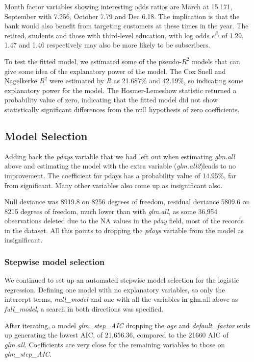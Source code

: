 \documentclass[9pt,technote]{IEEEtran}
\begin{document}
Month factor variables showing interesting odds ratios are March at 15.171, September with 7.256, October 7.79 and Dec 6.18.  The implication is that the bank would also benefit from targeting customers at these times in the year.  The retired, students and those with third-level education, with log odds $e^{\beta_i}$ of 1.29, 1.47 and 1.46 respectively may also be more likely to be subscribers.  

To test the fitted model, we estimated some of the pseudo-$R^2$ models that can give some idea of the explanatory power of the model.  The Cox Snell and Nagelkerke $R^2$ were estimated by \textit{R} as 21.687\% and 42.19\%, so indicating some explanatory power for the model.  The Hosmer-Lemeshow statistic returned a probability value of zero, indicating that the fitted model did not show statistically significant differences from the null hypothesis of zero coefficients.   

\subsection{Model Selection}

Adding back the \textit{pdays} variable that we had left out when estimating \textit{glm.all} above and estimating the model with the extra variable (\textit{glm.all2})leads to no improvement.  The coefficient for pdays has a probability value of 14.95\%, far from significant.  Many other variables also come up as insignificant also.  

Null deviance was 8919.8 on 8256  degrees of freedom, residual deviance 5809.6 on 8215 degrees of freedom, much lower than with \textit{glm.all}, as some 36,954 observations deleted due to the NA values in the \textit{pday} field, most of the records in the dataset.  All this points to dropping the \textit{pdays} variable from the model as insignificant.  

\subsubsection{Stepwise model selection}

We continued to set up an automated stepwise model selection for the logistic regression. Defining one model with no explanatory variables, so only the intercept terms, \textit{null\_model} and one with all the variables in glm.all above as \textit{full\_model}, a search in both directions was specified.  

After iterating, a model \textit{glm_step_AIC} dropping the \textit{age} and \textit{default_factor} ends up generating the lowest AIC, of 21,656.36, compared to the 21660 AIC of \textit{glm.all}.  Coefficients are very close for the remaining variables to those on \textit{glm_step_AIC}.  
\end{document}
